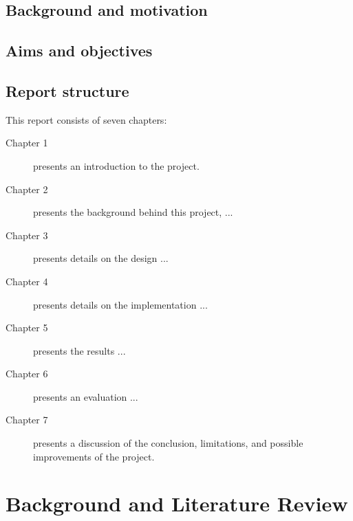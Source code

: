     
    \subsection{Background and motivation}
    
    \subsection{Aims and objectives}
    
    
    \subsection{Report structure} %
    
      This report consists of seven chapters:
      \begin{description}
      \item[Chapter 1] presents an introduction to the project.
      \item[Chapter 2] presents the background behind this project, ...
      \item[Chapter 3] presents details on the design ...
      \item[Chapter 4] presents details on the implementation ...
      \item[Chapter 5] presents the results ...
      \item[Chapter 6] presents an evaluation  ...
      \item[Chapter 7] presents a discussion of the conclusion, limitations, and possible improvements of the project.
    \end{description}
    
    
    \section{Background and Literature Review} %
    
